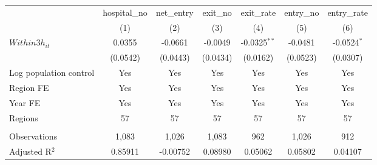 \begingroup
\centering
\begin{tabular}{lcccccc}
   \toprule
                          & hospital\_no  & net\_entry  & exit\_no  & exit\_rate     & entry\_no  & entry\_rate \\    
                          & (1)           & (2)         & (3)       & (4)            & (5)        & (6)\\  
   \midrule 
   $Within3h_{it}$        & 0.0355        & -0.0661     & -0.0049   & -0.0325$^{**}$ & -0.0481    & -0.0524$^{*}$\\   
                          & (0.0542)      & (0.0443)    & (0.0434)  & (0.0162)       & (0.0523)   & (0.0307)\\   
   Log population control & Yes           & Yes         & Yes       & Yes            & Yes        & Yes\\  
   Region FE              & Yes           & Yes         & Yes       & Yes            & Yes        & Yes\\  
   Year FE                & Yes           & Yes         & Yes       & Yes            & Yes        & Yes\\  
   Regions                & 57            & 57          & 57        & 57             & 57         & 57\\  
    \\
   Observations           & 1,083         & 1,026       & 1,083     & 962            & 1,026      & 912\\  
   Adjusted R$^2$         & 0.85911       & -0.00752    & 0.08980   & 0.05062        & 0.05802    & 0.04107\\  
   \bottomrule
\end{tabular}
\par\endgroup
